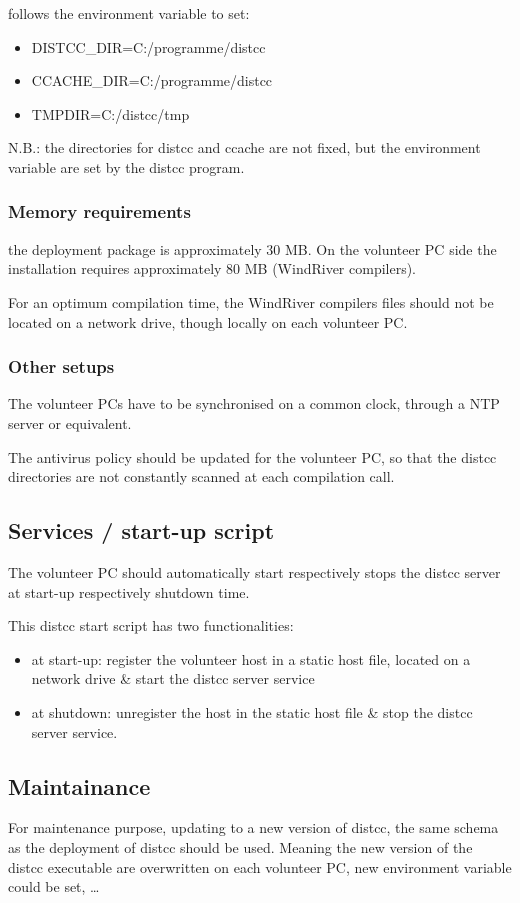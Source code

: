 \documentclass{article}
\begin{document}
follows the environment variable to set:
\begin{itemize}
	\item DISTCC\_DIR=C:/programme/distcc
	\item CCACHE\_DIR=C:/programme/distcc
	\item TMPDIR=C:/distcc/tmp
\end{itemize}

N.B.: the directories for distcc and ccache are not fixed, but the environment
variable are set by the distcc program.

\subsubsection{Memory requirements}

the deployment package is approximately 30 MB. On the volunteer PC side the
installation requires approximately 80 MB (WindRiver compilers).

For an optimum compilation time, the WindRiver compilers files should not be
located on a network drive, though locally on each volunteer PC.

\subsubsection{Other setups}
The volunteer PCs have to be synchronised on a common clock, through a NTP server
or equivalent.

The antivirus policy should be updated for the volunteer PC, so that the
distcc directories are not constantly scanned at each compilation call.

\subsection{Services / start-up script}
The volunteer PC should automatically start respectively stops the distcc server
at start-up respectively shutdown time.

This distcc start script has two functionalities:
\begin{itemize}
  \item at start-up: register the volunteer host in a static host file, located
  on a network drive \& start the distcc server service
  \item at shutdown: unregister the host in the static host file \& stop the distcc server service.
\end{itemize}

\subsection{Maintainance}
For maintenance purpose, updating to a new version of distcc, the same schema as
the deployment of distcc should be used. Meaning the new version of the distcc
executable are overwritten on each volunteer PC, new environment variable could
be set, \ldots

{}

\end{document}
